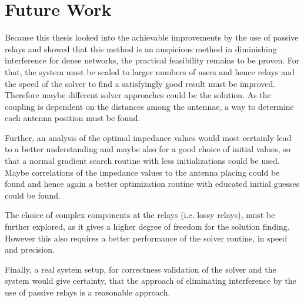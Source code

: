 \section{Future Work}
\label{sec:outlook}
Because this thesis looked into the achievable improvements by the use of passive relays and showed that this method is an auspicious method in diminishing interference for dense networks, the practical feasibility remains to be proven.
For that, the system must be scaled to larger numbers of users and hence relays and the speed of the solver to find a satisfyingly good result must be improved.
Therefore maybe different solver approaches could be the solution.
As the coupling is dependent on the distances among the antennae, a way to determine each antenna position must be found.

Further, an analysis of the optimal impedance values would most certainly lead to a better understanding and maybe also for a good choice of initial values, so that a normal gradient search routine with less initializations could be used.
Maybe correlations of the impedance values to the antenna placing could be found and hence again a better optimization routine with educated initial guesses could be found.

The choice of complex components at the relays (i.e. lossy relays), must be further explored, as it gives a higher degree of freedom for the solution finding.
However this also requires a better performance of the solver routine, in speed and precision.

Finally, a real system setup, for correctness validation of the solver and the system would give certainty, that the approach of eliminating interference by the use of passive relays is a reasonable approach.

